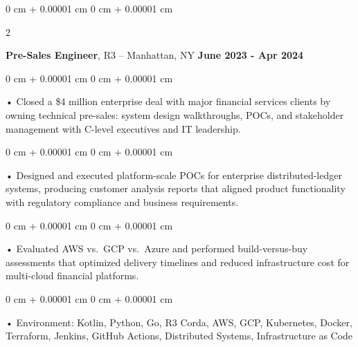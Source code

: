 \documentclass[10pt, letterpaper]{article}
\newenvironment{onecolentry}{
    \begin{adjustwidth}{
        0 cm + 0.00001 cm
    }{
        0 cm + 0.00001 cm
    }
}{
    \end{adjustwidth}
} %
\newenvironment{twocolentry}[2][]{
    \onecolentry
    \def\secondColumn{#2}
    \setcolumnwidth{\fill, 4.5 cm}
    \begin{paracol}{2}
}{
    \switchcolumn \raggedleft \secondColumn
    \end{paracol}
    \endonecolentry
} %
\begin{document}
        \begin{twocolentry}{
            \textbf{June 2023 - Apr 2024}
        }
            \textbf{Pre-Sales Engineer}, R3 -- Manhattan, NY\end{twocolentry}


        \begin{onecolentry}
             • Closed a \$4 million enterprise deal with major financial services clients by owning technical pre-sales: system design walkthroughs, POCs, and stakeholder management with C-level executives and IT leadership.
        \end{onecolentry}
        \begin{onecolentry}
             • Designed and executed platform-scale POCs for enterprise distributed-ledger systems, producing customer analysis reports that aligned product functionality with regulatory compliance and business requirements.
        \end{onecolentry}
        \begin{onecolentry}
             • Evaluated AWS vs.\ GCP vs.\ Azure and performed build-versus-buy assessments that optimized delivery timelines and reduced infrastructure cost for multi-cloud financial platforms.
        \end{onecolentry}
        \begin{onecolentry}
             • Environment: Kotlin, Python, Go, R3 Corda, AWS, GCP, Kubernetes, Docker, Terraform, Jenkins, GitHub Actions, Distributed Systems, Infrastructure as Code
        \end{onecolentry}
        \vspace{0.1cm}
\end{document}
